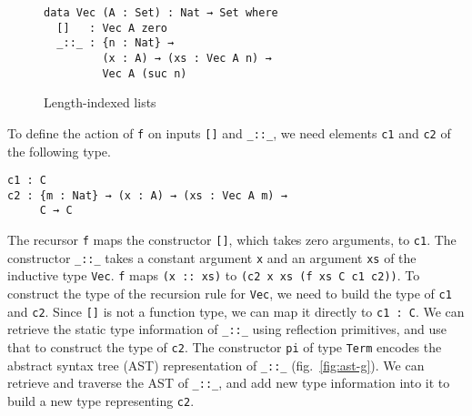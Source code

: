 \documentclass[sigplan,10pt]{acmart}
\begin{document}
\begin{figure}
\begin{center}
\begingroup
\begin{BVerbatim}
data Vec (A : Set) : Nat → Set where
  []   : Vec A zero
  _::_ : {n : Nat} →
         (x : A) → (xs : Vec A n) → 
         Vec A (suc n)
\end{BVerbatim}
\endgroup
\end{center}
\caption{Length-indexed lists}
\label{fig:vec}
\end{figure}

To define the action of {\tt f} on inputs {\tt []} and {\tt \_::\_}, we need elements {\tt c1} and {\tt c2} of the following type.

\begin{center}
\begingroup
\begin{BVerbatim}
c1 : C
c2 : {m : Nat} → (x : A) → (xs : Vec A m) → 
     C → C
\end{BVerbatim}
\endgroup
\end{center}
\normalsize


The recursor {\tt f} maps the constructor {\tt []}, which takes zero arguments, to {\tt c1}. The constructor {\tt \_::\_} takes a constant argument {\tt x} and an argument {\tt xs} of the inductive type {\tt Vec}. {\tt f} maps {\tt (x :: xs)} to {\tt (c2 x xs (f xs C c1 c2))}. To construct the type of the recursion rule for {\tt Vec}, we need to build the type of {\tt c1} and {\tt c2}. Since {\tt []} is not a function type, we can map it directly to {\tt c1 : C}. We can retrieve the static type information of {\tt \_::\_} using reflection primitives, and use that to construct the type of {\tt c2}. The constructor {\tt pi} of type {\tt Term} encodes the abstract syntax tree (AST) representation of {\tt \_::\_} (fig.~\ref{fig:ast-g}). We can retrieve and traverse the AST of {\tt \_::\_}, and add new type information into it to build a new type representing {\tt c2}.
\end{document}
